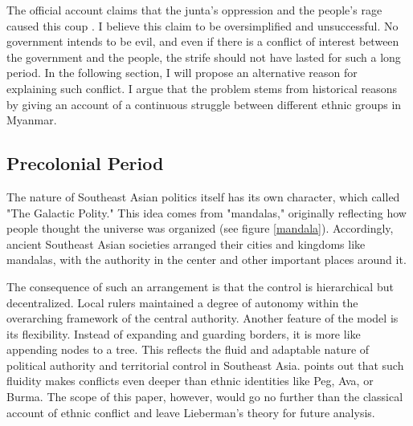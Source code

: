 \documentclass[man,floatsintext]{apa7}
\begin{document}
The official account claims that the junta's oppression and the people's rage caused this coup \autocite{htetminlwinOperation1027End2023}. I believe this claim to be oversimplified and unsuccessful. No government intends to be evil, and even if there is a conflict of interest between the government and the people, the strife should not have lasted for such a long period. In the following section, I will propose an alternative reason for explaining such conflict. I argue that the problem stems from historical reasons by giving an account of a continuous struggle between different ethnic groups in Myanmar.

\subsection{Precolonial Period}

The nature of Southeast Asian politics itself has its own character, which \textcite{tambiahGalacticPolity2007} called "The Galactic Polity." This idea comes from "mandalas," originally reflecting how people thought the universe was organized (see figure \ref{mandala}). Accordingly, ancient Southeast Asian societies arranged their cities and kingdoms like mandalas, with the authority in the center and other important places around it. 

The consequence of such an arrangement is that the control is hierarchical but decentralized. Local rulers maintained a degree of autonomy within the overarching framework of the central authority. Another feature of the model is its flexibility. Instead of expanding and guarding borders, it is more like appending nodes to a tree. This reflects the fluid and adaptable nature of political authority and territorial control in Southeast Asia. \textcite{liebermanEthnicPoliticsEighteenthCentury1978} points out that such fluidity makes conflicts even deeper than ethnic identities like Peg, Ava, or Burma. The scope of this paper, however, would go no further than the classical account of ethnic conflict and leave Lieberman's theory for future analysis.
\end{document}
